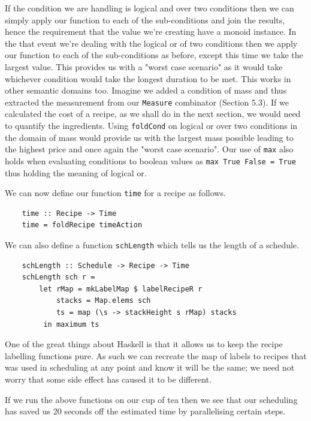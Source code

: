 \documentclass[11pt]{article}
\begin{document}
If the condition we are handling is logical and over two conditions then we can simply apply our function
to each of the sub-conditions and join the results, hence the requirement that the value we're
creating have a monoid instance. In the that event we're dealing with the logical or of two conditions then
we apply our function to each of the sub-conditions as before, except this time we take the largest value.
This provides us with a "worst case scenario" as it would take whichever condition would take the longest
duration to be met. This works in other semantic domains too. Imagine we added a condition of mass and thus
extracted the measurement from our \texttt{Measure} combinator (Section 5.3). If we calculated the cost of a recipe, as we shall
do in the next section, we would need to quantify the ingredients. Using \texttt{foldCond} on logical or over two
conditions in the domain of mass would provide us with the largest mass possible leading to the highest price and
once again the "worst case scenario". Our use of \texttt{max} also holds when evaluating conditions to boolean values
as \texttt{max True False = True} thus holding the meaning of logical or.

\medbreak

We can now define our function \texttt{time} for a recipe as follows.

\begin{lstlisting}
    time :: Recipe -> Time
    time = foldRecipe timeAction
\end{lstlisting}

We can also define a function \texttt{schLength} which tells us the length of a schedule.

\begin{lstlisting}
    schLength :: Schedule -> Recipe -> Time
    schLength sch r =
        let rMap = mkLabelMap $ labelRecipeR r
            stacks = Map.elems sch
            ts = map (\s -> stackHeight s rMap) stacks
         in maximum ts
\end{lstlisting}

One of the great things about Haskell is that it allows us to keep the recipe labelling
functions pure. As such we can recreate the map of labels to recipes that was used in
scheduling at any point and know it will be the same; we need not worry that some side
effect has caused it to be different.

\medbreak

If we run the above functions on our cup of tea then we see that our scheduling has
saved us 20 seconds off the estimated time by parallelising certain steps.
\end{document}

